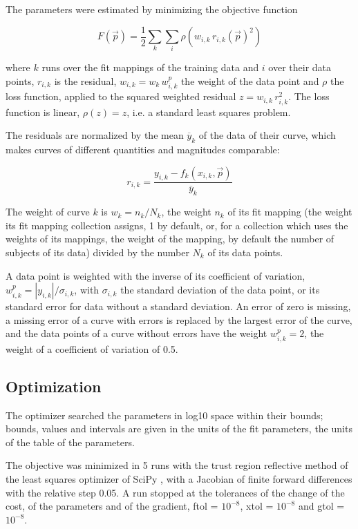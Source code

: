 The parameters were estimated by minimizing the objective function

\begin{equation}
F(\vec{p}) = \frac{1}{2} \sum_{k} \sum_{i} \rho\left(w_{i,k}\, r_{i,k}(\vec{p})^2\right)
\end{equation}

where $k$ runs over the fit mappings of the training data and $i$ over their data points, $r_{i,k}$ is the residual, $w_{i,k} = w_k\, w^{p}_{i,k}$ the weight of the data point and $\rho$ the loss function, applied to the squared weighted residual $z = w_{i,k}\, r_{i,k}^2$. The loss function is linear, $\rho(z) = z$, i.e. a standard least squares problem.

The residuals are normalized by the mean $\overline{y}_k$ of the data of their curve, which makes curves of different quantities and magnitudes comparable:

\begin{equation}
r_{i,k} = \frac{y_{i,k} - f_k(x_{i,k}, \vec{p})}{\overline{y}_k}
\end{equation}

The weight of curve $k$ is $w_k = n_k / N_k$, the weight $n_k$ of its fit mapping (the weight its fit mapping collection assigns, 1 by default, or, for a collection which uses the weights of its mappings, the weight of the mapping, by default the number of subjects of its data) divided by the number $N_k$ of its data points.

A data point is weighted with the inverse of its coefficient of variation, $w^{p}_{i,k} = |y_{i,k}| / \sigma_{i,k}$, with $\sigma_{i,k}$ the standard deviation of the data point, or its standard error for data without a standard deviation. An error of zero is missing, a missing error of a curve with errors is replaced by the largest error of the curve, and the data points of a curve without errors have the weight $w^{p}_{i,k} = 2$, the weight of a coefficient of variation of 0.5.

\subsection{Optimization}

The optimizer searched the parameters in log10 space within their bounds; bounds, values and intervals are given in the units of the fit parameters, the units of the table of the parameters.

The objective was minimized in 5 runs with the trust region reflective method \cite{Branch1999} of the least squares optimizer of SciPy \cite{Virtanen2020}, with a Jacobian of finite forward differences with the relative step 0.05. A run stopped at the tolerances of the change of the cost, of the parameters and of the gradient, ftol = $10^{-8}$, xtol = $10^{-8}$ and gtol = $10^{-8}$.

